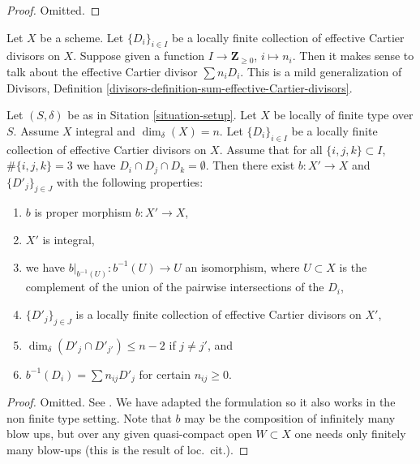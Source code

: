 \begin{proof}
Omitted.
\end{proof}

\noindent
Let $X$ be a scheme. Let $\{D_i\}_{i \in I}$ be a locally finite collection
of effective Cartier divisors on $X$. Suppose given a function
$I \to \mathbf{Z}_{\geq 0}$, $i \mapsto n_i$. Then it makes sense to talk
about the effective Cartier divisor $\sum n_i D_i$. This is a mild
generalization of Divisors,
Definition \ref{divisors-definition-sum-effective-Cartier-divisors}.

\begin{lemma}
\label{lemma-blowing-up-intersections}
Let $(S, \delta)$ be as in Sitation \ref{situation-setup}.
Let $X$ be locally of finite type over $S$.
Assume $X$ integral and $\dim_\delta(X) = n$.
Let $\{D_i\}_{i \in I}$ be a locally finite collection of
effective Cartier divisors on $X$.
Assume that for all $\{i, j, k\} \subset I$, $\#\{i, j, k\} = 3$
we have $D_i \cap D_j \cap D_k = \emptyset$.
Then there exist $b : X' \to X$ and $\{D'_j\}_{j \in J}$ with
the following properties:
\begin{enumerate}
\item $b$ is proper morphism $b : X' \to X$,
\item $X'$ is integral,
\item we have $b|_{b^{-1}(U)} : b^{-1}(U) \to U$ an isomorphism, where
$U \subset X$ is the complement of the union of the pairwise
intersections of the $D_i$,
\item $\{D'_j\}_{j \in J}$ is a locally finite collection of effective
Cartier divisors on $X'$,
\item $\dim_\delta(D'_j \cap D'_{j'}) \leq n - 2$ if $j \not = j'$, and
\item $b^{-1}(D_i) = \sum n_{ij} D'_j$ for certain $n_{ij} \geq 0$.
\end{enumerate}
\end{lemma}

\begin{proof}
Omitted. See \cite[Section 2.4]{F}. We have adapted the formulation
so it also works in the non finite type setting.
Note that $b$ may be the composition of infinitely many blow
ups, but over any given quasi-compact open $W \subset X$ one needs
only finitely many blow-ups (this is the result of loc.\ cit.).
\end{proof}







